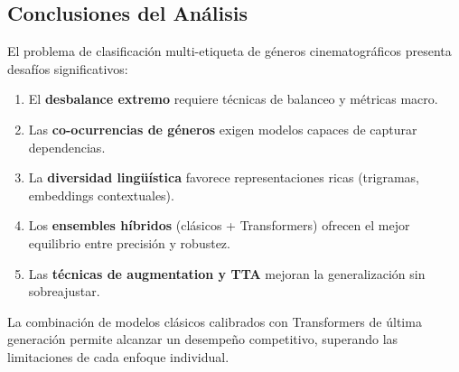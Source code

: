 \subsection{Conclusiones del Análisis}

El problema de clasificación multi-etiqueta de géneros cinematográficos presenta desafíos significativos:

\begin{enumerate}
    \item El \textbf{desbalance extremo} requiere técnicas de balanceo y métricas macro.
    \item Las \textbf{co-ocurrencias de géneros} exigen modelos capaces de capturar dependencias.
    \item La \textbf{diversidad lingüística} favorece representaciones ricas (trigramas, embeddings contextuales).
    \item Los \textbf{ensembles híbridos} (clásicos + Transformers) ofrecen el mejor equilibrio entre precisión y robustez.
    \item Las \textbf{técnicas de augmentation y TTA} mejoran la generalización sin sobreajustar.
\end{enumerate}

La combinación de modelos clásicos calibrados con Transformers de última generación permite alcanzar un desempeño competitivo, superando las limitaciones de cada enfoque individual.
